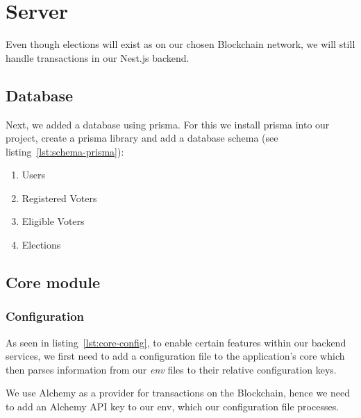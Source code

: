 \section{Server}\label{sec:server}

Even though elections will exist as  on our chosen \gls{Blockchain} network, we will still handle transactions in our Nest.js backend.

\subsection{Database}\label{subsec:database}


Next, we added a database using prisma.
For this we install prisma into our project, create a prisma library and add a database schema (see listing~\ref{lst:schema-prisma}):

\begin{enumerate}
    \item Users
    \item Registered Voters
    \item Eligible Voters
    \item Elections
\end{enumerate}

\subsection{Core module}\label{subsec:core-module}

\subsubsection{Configuration}

As seen in listing~\ref{lst:core-config}, to enable certain features within our backend services, we first need to add a configuration file to the application's core which then parses information from our \emph{env} files to their relative configuration keys.


We use Alchemy as a provider for transactions on the \gls{Blockchain}, hence we need to add an Alchemy \gls{API} key to our env, which our configuration file processes.

